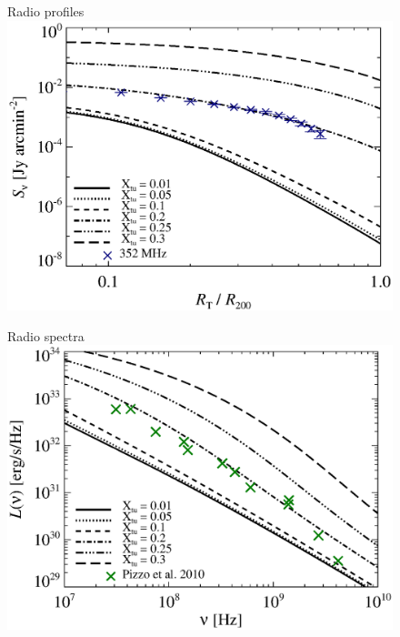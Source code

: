 \documentclass[a4paper,fleqn,usenatbib]{mnras}
\begin{document}
\begin{figure}
\begin{minipage}{1\columnwidth}
   \begin{center}\Large{Radio profiles}\\
     \includegraphics[width=\columnwidth]{prof.comp.KrTTDth.Xtu.eps}
   \end{center}
\end{minipage}
\begin{minipage}{1\columnwidth}
   \begin{center}\Large{Radio spectra}\\
     \includegraphics[width=\columnwidth]{spec.comp.KrTTDth.Xtu.eps}
   \end{center}
\end{minipage}

\end{figure}
\end{document}
